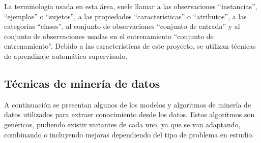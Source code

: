 La terminología usada en esta área, suele llamar a las observaciones “instancias”, “ejemplos” o “sujetos”, a las propiedades “características” o “atributos”, a las categorías “clases”, al conjunto de observaciones “conjunto de entrada” y al conjunto de observaciones usadas en el entrenamiento “conjunto de entrenamiento”. Debido a las características de este proyecto, se utilizan técnicas de aprendizaje automático supervisado.

\subsection{Técnicas de minería de datos}
\label{subsec:tecnicas-mineria}
A continuación se presentan algunos de los modelos y algoritmos de minería de datos utilizados para extraer conocimiento desde los datos. Estos algoritmos son genéricos, pudiendo existir variantes de cada uno, ya que se van adaptando, combinando o incluyendo mejoras dependiendo del tipo de problema en estudio. 

